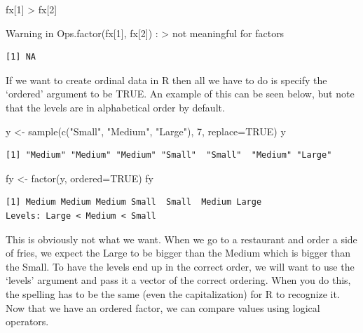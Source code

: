 \documentclass[
  letterpaper,
  DIV=11,
  numbers=noendperiod]{scrreprt}
\newenvironment{Shaded}{\begin{snugshade}}{\end{snugshade}}
\newcommand{\AttributeTok}[1]{\textcolor[rgb]{0.40,0.45,0.13}{#1}}
\newcommand{\ConstantTok}[1]{\textcolor[rgb]{0.56,0.35,0.01}{#1}}
\newcommand{\DecValTok}[1]{\textcolor[rgb]{0.68,0.00,0.00}{#1}}
\newcommand{\FunctionTok}[1]{\textcolor[rgb]{0.28,0.35,0.67}{#1}}
\newcommand{\NormalTok}[1]{\textcolor[rgb]{0.00,0.23,0.31}{#1}}
\newcommand{\OtherTok}[1]{\textcolor[rgb]{0.00,0.23,0.31}{#1}}
\newcommand{\SpecialCharTok}[1]{\textcolor[rgb]{0.37,0.37,0.37}{#1}}
\newcommand{\StringTok}[1]{\textcolor[rgb]{0.13,0.47,0.30}{#1}}
\begin{document}
\begin{Shaded}
\begin{Highlighting}[]
\NormalTok{fx[}\DecValTok{1}\NormalTok{] }\SpecialCharTok{\textgreater{}}\NormalTok{ fx[}\DecValTok{2}\NormalTok{]}
\end{Highlighting}
\end{Shaded}

{Warning in Ops.factor(fx{[}1{]}, fx{[}2{]}) :
\textquotesingle\textgreater\textquotesingle{} not meaningful for
factors}

\begin{verbatim}
[1] NA
\end{verbatim}

If we want to create ordinal data in R then all we have to do is specify
the `ordered' argument to be TRUE. An example of this can be seen below,
but note that the levels are in alphabetical order by default.

\begin{Shaded}
\begin{Highlighting}[]
\NormalTok{y }\OtherTok{\textless{}{-}} \FunctionTok{sample}\NormalTok{(}\FunctionTok{c}\NormalTok{(}\StringTok{"Small"}\NormalTok{, }\StringTok{"Medium"}\NormalTok{, }\StringTok{"Large"}\NormalTok{), }\DecValTok{7}\NormalTok{, }\AttributeTok{replace=}\ConstantTok{TRUE}\NormalTok{)}
\NormalTok{y}
\end{Highlighting}
\end{Shaded}

\begin{verbatim}
[1] "Medium" "Medium" "Medium" "Small"  "Small"  "Medium" "Large" 
\end{verbatim}

\begin{Shaded}
\begin{Highlighting}[]
\NormalTok{fy }\OtherTok{\textless{}{-}} \FunctionTok{factor}\NormalTok{(y, }\AttributeTok{ordered=}\ConstantTok{TRUE}\NormalTok{)}
\NormalTok{fy}
\end{Highlighting}
\end{Shaded}

\begin{verbatim}
[1] Medium Medium Medium Small  Small  Medium Large 
Levels: Large < Medium < Small
\end{verbatim}

This is obviously not what we want. When we go to a restaurant and order
a side of fries, we expect the Large to be bigger than the Medium which
is bigger than the Small. To have the levels end up in the correct
order, we will want to use the `levels' argument and pass it a vector of
the correct ordering. When you do this, the spelling has to be the same
(even the capitalization) for R to recognize it. Now that we have an
ordered factor, we can compare values using logical operators.
\end{document}
